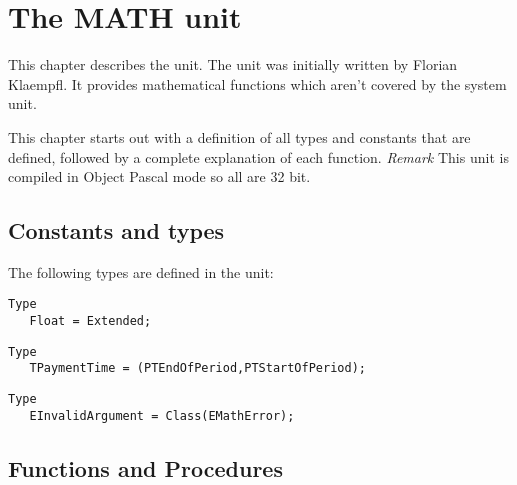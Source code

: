 %
%
%
%
%
\chapter{The MATH unit}

This chapter describes the  unit. The  unit
was initially written by Florian Klaempfl. It provides mathematical
functions which aren't covered by the system unit.

This chapter starts out with a definition of all types and constants
that are defined, followed by a complete explanation of each function.
{\em Remark} This unit is compiled in Object Pascal mode so all
 are 32 bit.

\section{Constants and types}

The following types are defined in the  unit:
\begin{verbatim}
Type
   Float = Extended;
\end{verbatim}

\begin{verbatim}
Type
   TPaymentTime = (PTEndOfPeriod,PTStartOfPeriod);
\end{verbatim}

\begin{verbatim}
Type
   EInvalidArgument = Class(EMathError);
\end{verbatim}

\section{Functions and Procedures}

